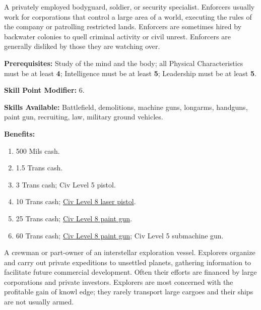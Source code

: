 \bigskip

\pagebreak[2]

\label{sec:prof-enforcer}

A privately employed bodyguard, soldier, or security specialist.
Enforcers usually work for corporations that control a large area of a
world, executing the rules of the company or patrolling restricted
lands. Enforcers are sometimes hired by backwater colonies to quell
criminal activity or civil unrest. Enforcers are generally disliked by
those they are watching over.

\textbf{Prerequisites:} Study of the mind and the body; all Physical
Characteristics must be at least \textbf{4}; Intelligence must be at least \textbf{5};
Leadership must be at least \textbf{5}.

\textbf{Skill Point Modifier:} 6.

\textbf{Skills Available:} Battlefield, demolitions, machine guns,
longarms, handguns, paint gun, recruiting, law, military ground
vehicles.

\pagebreak[2]
\textbf{Benefits:}
\begin{enumerate}
\item 500 Mils cash.
\item 1.5 Trans cash.
\item 3 Trans cash; Civ Level 5 pistol.
\item 10 Trans cash; \hyperlink{tag:cl8-laser}{Civ Level 8 laser pistol}.
\item 25 Trans cash; \hyperlink{tag:cl8-paintgun}{Civ Level 8 paint gun}.
\item 60 Trans cash; \hyperlink{tag:cl8-paintgun}{Civ Level 8 paint gun}; Civ Level 5 submachine
  gun.
\end{enumerate}

\bigskip

\pagebreak[2]

\label{sec:prof-explorer}

A crewman or part-owner of an interstellar exploration vessel.
Explorers organize and carry out private expeditions to unsettled
planets, gathering information to facilitate future commercial
development. Often their efforts are financed by large corporations
and private investors. Explorers are most concerned with the
profitable gain of knowl edge; they rarely transport large cargoes and
their ships are not usually armed.

